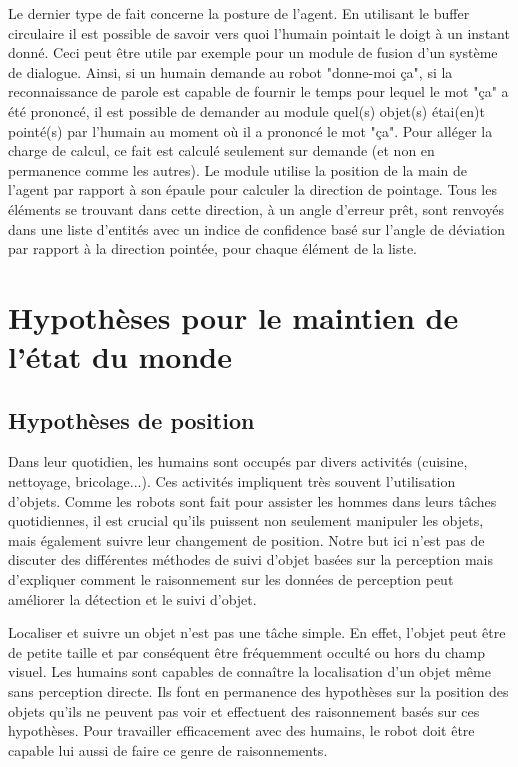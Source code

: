 \documentclass[a4paper,11pt,twoside]{StyleThese}
\begin{document}
Le dernier type de fait concerne la posture de l'agent. En utilisant le buffer circulaire il est possible de savoir vers quoi l'humain pointait le doigt à un instant donné. Ceci peut être utile par exemple pour un module de fusion d'un système de dialogue. Ainsi, si un humain demande au robot "donne-moi ça", si la reconnaissance de parole est capable de fournir le temps pour lequel le mot "ça" a été prononcé, il est possible de demander au module quel(s) objet(s) étai(en)t pointé(s) par l'humain au moment où il a prononcé le mot "ça". Pour alléger la charge de calcul, ce fait est calculé seulement sur demande (et non en permanence comme les autres). Le module utilise la position de la main de l'agent par rapport à son épaule pour calculer la direction de pointage. Tous les éléments se trouvant dans cette direction, à un angle d'erreur prêt, sont renvoyés dans une liste d'entités avec un indice de confidence basé sur l'angle de déviation par rapport à la direction pointée, pour chaque élément de la liste.




\section{Hypothèses pour le maintien de l'état du monde}
\label{sec:hypo}
\subsection{Hypothèses de position}


Dans leur quotidien, les humains sont occupés par divers activités (cuisine, nettoyage, bricolage...). Ces activités impliquent très souvent l'utilisation d'objets. Comme les robots sont fait pour assister les hommes dans leurs tâches quotidiennes, il est crucial qu'ils puissent non seulement manipuler les objets, mais également suivre leur changement de position. Notre but ici n'est pas de discuter des différentes méthodes de suivi d'objet basées sur la perception mais d'expliquer comment le raisonnement sur les données de perception peut améliorer la détection et le suivi d'objet.

Localiser et suivre un objet n'est pas une tâche simple. En effet, l'objet peut être de petite taille et par conséquent être fréquemment occulté ou hors du champ visuel.
Les humains sont capables de connaître la localisation d'un objet même sans perception directe. Ils font en permanence des hypothèses sur la position des objets qu'ils ne peuvent pas voir et effectuent des raisonnement basés sur ces hypothèses. Pour travailler efficacement avec des humains, le robot doit être capable lui aussi de faire ce genre de raisonnements.
\end{document}
